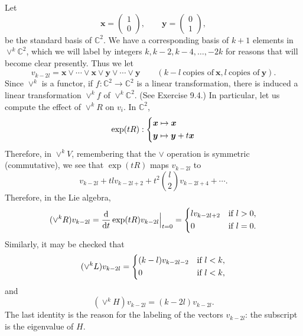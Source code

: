 \documentclass[12pt,reqno]{book}%
\theoremstyle{definition}
\theoremstyle{remark}
\theoremstyle{theorem}
\theoremstyle{remark}
\begin{document}
Let
\[
    \bm{x} = \begin{pmatrix}
        1 \\
        0
    \end{pmatrix}, \qquad \bm{y} = \begin{pmatrix}
        0 \\
        1
    \end{pmatrix},
\]
be the standard basis of $\mathbb{C}^2$.
We have a corresponding basis of $k + 1$ elements in $\vee^k\mathbb{C}^2$, which we will label by integers $k, k - 2, k - 4, \ldots, -2k$ for reasons that will become clear presently.
Thus we let
\[
    v_{k - 2l} = \bm{x} \vee \cdots \vee \bm{x} \vee \bm{y} \vee \cdots \vee \bm{y} \qquad (k - l \ \text{copies of} \ \bm{x}, l \ \text{copies of} \ \bm{y}).
\]
Since $\vee^k$ is a functor, if $f : \mathbb{C}^2 \to \mathbb{C}^2$ is a linear transformation, there is induced a linear transformation $\vee^kf$ of $\vee^k\mathbb{C}^2$.
(See Exercise 9.4.)
In particular, let us compute the effect of $\vee^kR$ on $v_i$.
In $\mathbb{C}^2$,
\[
    \exp(tR) :
    \begin{dcases}
        \bm{x} \mapsto \bm{x} \\
        \bm{y} \mapsto \bm{y} + t\bm{x}
    \end{dcases}
\]
Therefore, in $\vee^kV$, remembering that the $\vee$ operation is symmetric (commutative), we see that $\exp(tR)$ maps $v_{k - 2l}$ to
\[
    v_{k - 2l} + tlv_{k - 2l + 2} + t^2 {l \choose 2} v_{k - 2l + 4} + \cdots.
\]
Therefore, in the Lie algebra,
\begin{equation}\label{eq12.2}
    (\vee^kR)v_{k - 2l} = \dv{t} \exp(tR)v_{k - 2l} \Big|_{t = 0} =
    \begin{dcases}
        lv_{k - 2l + 2} & \text{if} \ l > 0, \\
        0 & \text{if} \ l = 0.
    \end{dcases}
\end{equation}
Similarly, it may be checked that
\begin{equation}\label{eq12.3}
    (\vee^kL)v_{k - 2l} =
    \begin{dcases}
        (k - l)v_{k - 2l - 2} & \text{if} \ l < k, \\
        0 & \text{if} \ l < k,
    \end{dcases}
\end{equation}
and
\begin{equation}\label{eq12.4}
    (\vee^kH)v_{k - 2l} = (k -  2l)v_{k - 2l}.
\end{equation}
The last identity is the reason for the labeling of the vectors $v_{k - 2l}$: the subscript is the eigenvalue of $H$.
\end{document}
